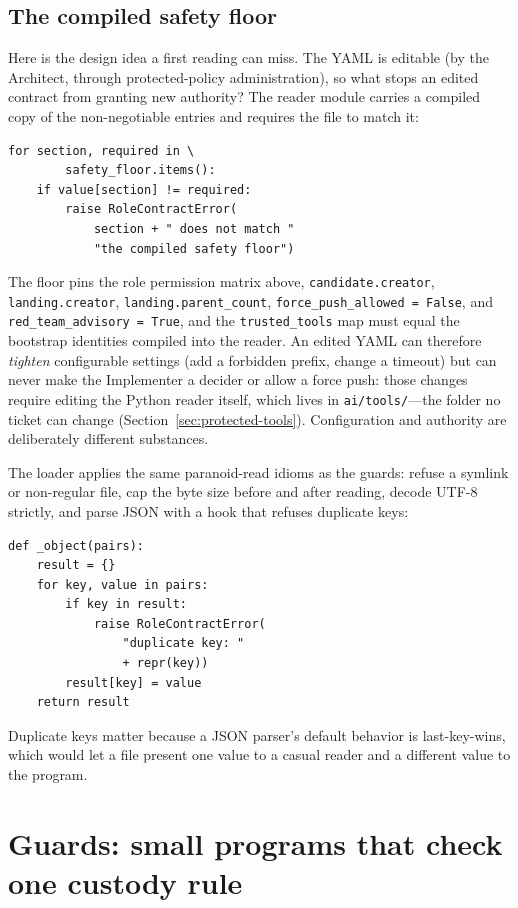 \documentclass[10pt,aps,prd,twocolumn,nofootinbib]{revtex4-2}
\newcommand{\code}[1]{\texttt{#1}}
\newcommand{\file}[1]{\texttt{#1}}
\begin{document}
\subsection{The compiled safety floor}

Here is the design idea a first reading can miss.  The YAML is
editable (by the Architect, through protected-policy administration),
so what stops an edited contract from granting new authority?  The
reader module carries a compiled copy of the non-negotiable entries and
requires the file to match it:

\begin{verbatim}
for section, required in \
        safety_floor.items():
    if value[section] != required:
        raise RoleContractError(
            section + " does not match "
            "the compiled safety floor")
\end{verbatim}

The floor pins the role permission matrix above,
\code{candidate.creator}, \code{landing.creator},
\code{landing.parent\_count}, \code{force\_push\_allowed = False},
and \code{red\_team\_advisory = True}, and the \code{trusted\_tools}
map must equal the bootstrap identities compiled into the reader.  An
edited YAML can therefore \emph{tighten} configurable settings (add a
forbidden prefix, change a timeout) but can never make the Implementer
a decider or allow a force push: those changes require editing the
Python reader itself, which lives in \file{ai/tools/}---the folder no
ticket can change (Section~\ref{sec:protected-tools}).  Configuration
and authority are deliberately different substances.

The loader applies the same paranoid-read idioms as the guards:
refuse a symlink or non-regular file, cap the byte size before and
after reading, decode UTF-8 strictly, and parse JSON with a hook that
refuses duplicate keys:

\begin{verbatim}
def _object(pairs):
    result = {}
    for key, value in pairs:
        if key in result:
            raise RoleContractError(
                "duplicate key: "
                + repr(key))
        result[key] = value
    return result
\end{verbatim}

Duplicate keys matter because a JSON parser's default behavior is
last-key-wins, which would let a file present one value to a casual
reader and a different value to the program.

\section{Guards: small programs that check one custody rule}
\label{sec:guards}
\end{document}
